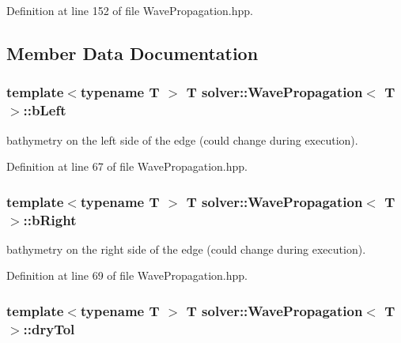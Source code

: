 Definition at line 152 of file Wave\+Propagation.\+hpp.



\subsection{Member Data Documentation}
\subsubsection[{\texorpdfstring{b\+Left}{bLeft}}]{\setlength{\rightskip}{0pt plus 5cm}template$<$typename T $>$ T {\bf solver\+::\+Wave\+Propagation}$<$ T $>$\+::b\+Left\hspace{0.3cm}{\ttfamily [protected]}}\hypertarget{classsolver_1_1WavePropagation_a809a5429a8d62ea7308611ed600ba679}{}\label{classsolver_1_1WavePropagation_a809a5429a8d62ea7308611ed600ba679}


bathymetry on the left side of the edge (could change during execution). 



Definition at line 67 of file Wave\+Propagation.\+hpp.

\subsubsection[{\texorpdfstring{b\+Right}{bRight}}]{\setlength{\rightskip}{0pt plus 5cm}template$<$typename T $>$ T {\bf solver\+::\+Wave\+Propagation}$<$ T $>$\+::b\+Right\hspace{0.3cm}{\ttfamily [protected]}}\hypertarget{classsolver_1_1WavePropagation_a36a205e462d5775b7b343e25ab390e61}{}\label{classsolver_1_1WavePropagation_a36a205e462d5775b7b343e25ab390e61}


bathymetry on the right side of the edge (could change during execution). 



Definition at line 69 of file Wave\+Propagation.\+hpp.

\subsubsection[{\texorpdfstring{dry\+Tol}{dryTol}}]{\setlength{\rightskip}{0pt plus 5cm}template$<$typename T $>$ T {\bf solver\+::\+Wave\+Propagation}$<$ T $>$\+::dry\+Tol\hspace{0.3cm}{\ttfamily [protected]}}\hypertarget{classsolver_1_1WavePropagation_a4a05c4bd71fdd1f8934ae5faddcea080}{}\label{classsolver_1_1WavePropagation_a4a05c4bd71fdd1f8934ae5faddcea080}


